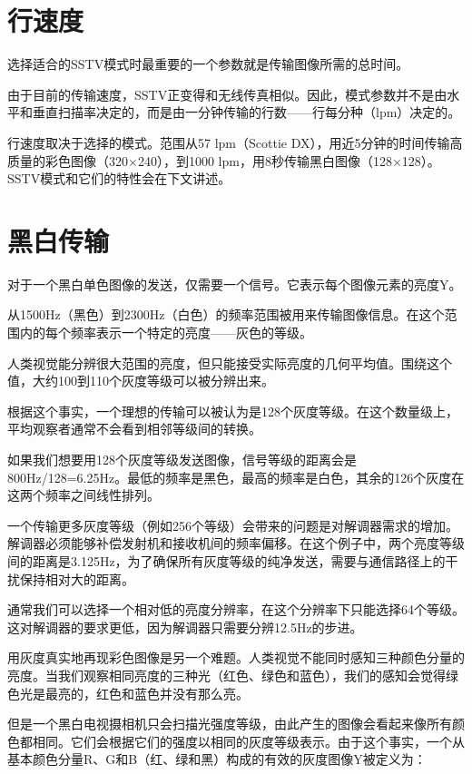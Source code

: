 \section{行速度}

选择适合的SSTV模式时最重要的一个参数就是传输图像所需的总时间。

由于目前的传输速度，SSTV正变得和无线传真相似。因此，模式参数并不是由水平和垂直扫描率决定的，而是由一分钟传输的行数——行每分种（lpm）决定的。

行速度取决于选择的模式。范围从57 lpm（Scottie DX），用近5分钟的时间传输高质量的彩色图像（320×240），到1000 lpm，用8秒传输黑白图像（128×128）。SSTV模式和它们的特性会在下文讲述。

\section{黑白传输}

对于一个黑白单色图像的发送，仅需要一个信号。它表示每个图像元素的亮度Y。

从1500Hz（黑色）到2300Hz（白色）的频率范围被用来传输图像信息。在这个范围内的每个频率表示一个特定的亮度——灰色的等级。

人类视觉能分辨很大范围的亮度，但只能接受实际亮度的几何平均值。围绕这个值，大约100到110个灰度等级可以被分辨出来。

根据这个事实，一个理想的传输可以被认为是128个灰度等级。在这个数量级上，平均观察者通常不会看到相邻等级间的转换。

如果我们想要用128个灰度等级发送图像，信号等级的距离会是800Hz/128=6.25Hz。最低的频率是黑色，最高的频率是白色，其余的126个灰度在这两个频率之间线性排列。

一个传输更多灰度等级（例如256个等级）会带来的问题是对解调器需求的增加。解调器必须能够补偿发射机和接收机间的频率偏移。在这个例子中，两个亮度等级间的距离是3.125Hz，为了确保所有灰度等级的纯净发送，需要与通信路径上的干扰保持相对大的距离。

通常我们可以选择一个相对低的亮度分辨率，在这个分辨率下只能选择64个等级。这对解调器的要求更低，因为解调器只需要分辨12.5Hz的步进。

用灰度真实地再现彩色图像是另一个难题。人类视觉不能同时感知三种颜色分量的亮度。当我们观察相同亮度的三种光（红色、绿色和蓝色），我们的感知会觉得绿色光是最亮的，红色和蓝色并没有那么亮。

但是一个黑白电视摄相机只会扫描光强度等级，由此产生的图像会看起来像所有颜色都相同。它们会根据它们的强度以相同的灰度等级表示。由于这个事实，一个从基本颜色分量R、G和B（红、绿和黑）构成的有效的灰度图像Y被定义为：

